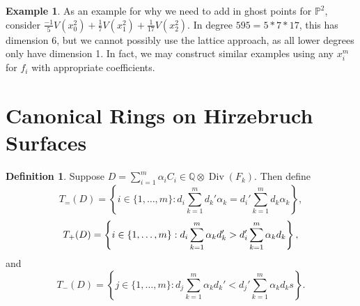 \documentclass{amsart}
\theoremstyle{plain}
\theoremstyle{definition}
\newtheorem{defn}[thm]{Definition}
\newtheorem{example}[thm]{Example}
\theoremstyle{remark}
\numberwithin{equation}{section}
\newcommand\bp{{\mathbb P}}
\DeclareMathOperator\di{Div}
\begin{document}
\begin{example}
\label{eg:radical}
As an example for why we need to add in ghost points for $\bp^2$, consider $\frac{-1}{5}V(x_0^2) + \frac{1}{7}V(x_1^2) + \frac{1}{17}V(x_2^2)$. In degree $595 = 5* 7 * 17$, this has dimension $6$, but we cannot possibly use the lattice approach, as all lower degrees only have dimension 1. In fact, we may construct similar examples using any $x_i^m$ for $f_i$ with appropriate coefficients.
\end{example}

\section{Canonical Rings on Hirzebruch Surfaces}
\begin{defn}
Suppose $D = \sum_{i=1}^m \alpha_i C_i \in \mathbb{Q} \otimes \di(F_k)$.  Then define 
\begin{equation}\label{eqn:define-T=(D)}
	T_=(D) = \left\{i \in \{1, \ldots, m\}: d_i \sum_{k=1}^m d_k' \alpha_k = d_i' \sum_{k=1}^m d_k \alpha_k \right\},
\end{equation}
\begin{equation}\label{eqn:define-T+(D)}
	T_+(D) = \left\{ i \in \{1, \ldots, m\}:  \vphantom{\sum_{k=1}^m} d_i \sum_{k=1}^m \alpha_k d_k' > d_i' \sum_{k=1}^m \alpha_k d_k \right\},
\end{equation}
and
\begin{equation}\label{eqn:define-T-(D)}
	T_-(D) = \left\{ j \in \{1, \ldots, m\}: d_j \sum_{k=1}^m \alpha_k d_k' < d_j' \sum_{k=1}^m \alpha_k d_k s \right\}.
\end{equation}
\end{defn}
\end{document}
